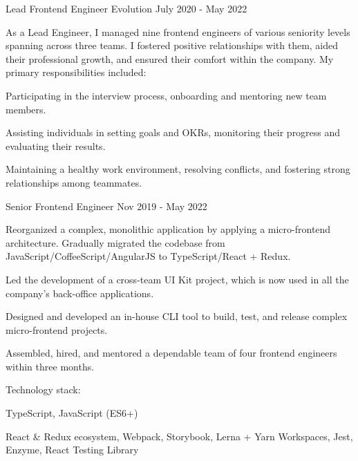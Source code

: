 \begin{cventries}
  \cventry
    {Lead Frontend Engineer} %
    {Evolution} %
    {} %
    {July 2020 - May 2022} %
    {
      As a Lead Engineer, I managed nine frontend engineers of various seniority levels spanning across three teams. I fostered positive relationships with them, aided their professional growth, and ensured their comfort within the company.
      \newline
      \vspace{2mm}
      My primary responsibilities included:
      \vspace{4mm}
      \begin{cvitems}
        \item Participating in the interview process, onboarding and mentoring new team members.
        \item Assisting individuals in setting goals and OKRs, monitoring their progress and evaluating their results.
        \item Maintaining a healthy work environment, resolving conflicts, and fostering strong relationships among teammates.
      \end{cvitems}
    }

  \cventry
    {Senior Frontend Engineer} %
    {} %
    {} %
    {Nov 2019 - May 2022} %
    {
      \begin{cvitems} 
        \item Reorganized a complex, monolithic application by applying a micro-frontend architecture. Gradually migrated the codebase from JavaScript/CoffeeScript/AngularJS to TypeScript/React + Redux.
        \item Led the development of a cross-team UI Kit project, which is now used in all the company’s back-office applications.
        \item Designed and developed an in-house CLI tool to build, test, and release complex micro-frontend projects.
        \item Assembled, hired, and mentored a dependable team of four frontend engineers within three months.
      \end{cvitems}
      \vspace{5mm}
      Technology stack:
      \begin{cvstackitems}
        \item TypeScript, JavaScript (ES6+)
        \item React \& Redux ecosystem, Webpack, Storybook, Lerna + Yarn Workspaces, Jest, Enzyme, React Testing Library
      \end{cvstackitems}
      \vspace{-2.0mm}
    }


\end{cventries}
